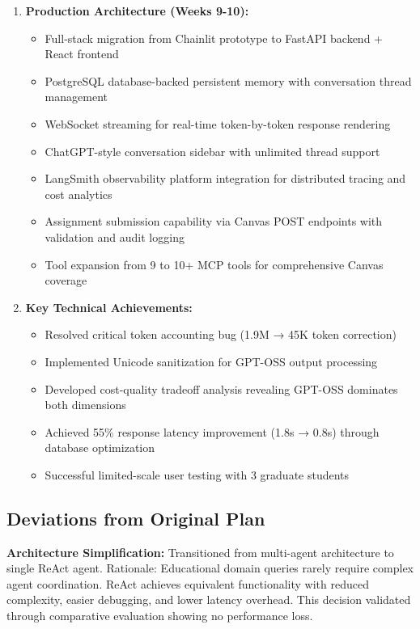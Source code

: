 \documentclass{article}
\begin{document}
\begin{enumerate}
    \item \textbf{Production Architecture (Weeks 9-10):}
    \begin{itemize}
        \item Full-stack migration from Chainlit prototype to FastAPI backend + React frontend
        \item PostgreSQL database-backed persistent memory with conversation thread management
        \item WebSocket streaming for real-time token-by-token response rendering
        \item ChatGPT-style conversation sidebar with unlimited thread support
        \item LangSmith observability platform integration for distributed tracing and cost analytics
        \item Assignment submission capability via Canvas POST endpoints with validation and audit logging
        \item Tool expansion from 9 to 10+ MCP tools for comprehensive Canvas coverage
    \end{itemize}
    
    \item \textbf{Key Technical Achievements:}
    \begin{itemize}
        \item Resolved critical token accounting bug (1.9M → 45K token correction)
        \item Implemented Unicode sanitization for GPT-OSS output processing
        \item Developed cost-quality tradeoff analysis revealing GPT-OSS dominates both dimensions
        \item Achieved 55\% response latency improvement (1.8s → 0.8s) through database optimization
        \item Successful limited-scale user testing with 3 graduate students
    \end{itemize}
\end{enumerate}

\subsection{Deviations from Original Plan}

\textbf{Architecture Simplification:} Transitioned from multi-agent architecture to single ReAct agent. Rationale: Educational domain queries rarely require complex agent coordination. ReAct achieves equivalent functionality with reduced complexity, easier debugging, and lower latency overhead. This decision validated through comparative evaluation showing no performance loss.
\end{document}
